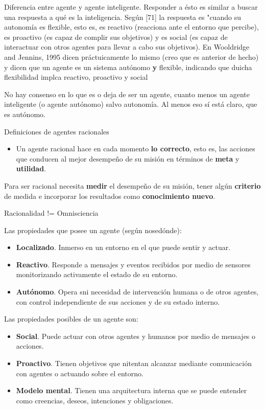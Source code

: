 Diferencia entre agente y agente inteligente. Responder a ésto es similar a buscar una respuesta a qué es la inteligencia. Según [71] la respuesta es "cuando su autonomía es flexible, esto es, es reactivo (reacciona ante el entorno que percibe), es proactivo (es capaz de complir sus objetivos) y es social (es capaz de interactuar con otros agentes para llevar a cabo sus objetivos). En Wooldridge and Jennins, 1995 dicen práctuicamente lo mismo (creo que es anterior de hecho) y dicen que un agente es un sistema autónomo \textbf{y} flexible, indicando que duicha flexibilidad implca reactivo, proactivo y social

No hay consenso en lo que es o deja de ser un agente, cuanto menos un agente inteligente (o agente autónomo) salvo autonomía. Al menos eso sí está claro, que es autónomo.

Definiciones de agentes racionales

\begin{itemize}
	\item Un agente racional hace en cada momento \textbf{lo correcto}, esto es, las acciones que conducen al mejor desempeño de su misión en términos de \textbf{meta} y \textbf{utilidad}.
\end{itemize}

Para ser racional necesita \textbf{medir} el desempeño de su misión, tener algún \textbf{criterio} de medida e incorporar los resultados como \textbf{conocimiento nuevo}.

Racionalidad != Omnisciencia

Las propiedades que posee un agente (según nosedónde):

\begin{itemize}
	\item \textbf{Localizado}. Inmerso en un entorno en el que puede sentir y actuar.
	\item \textbf{Reactivo}. Responde a mensajes y eventos recibidos por medio de sensores monitorizando activamente el estado de su entorno.
	\item \textbf{Autónomo}. Opera sni necesidad de intervención humana o de otros agentes, con control independiente de sus acciones y de su estado interno.
\end{itemize}

Las propiedades posibles de un agente son:

\begin{itemize}
	\item \textbf{Social}. Puede actuar con otros agentes y humanos por medio de mensajes o acciones.
	\item \textbf{Proactivo}. Tienen objetivos que nitentan alcanzar mediante comunicación con agentes o actuando sobre el entorno.
	\item \textbf{Modelo mental}. Tienen una arquitectura interna que se puede entender como creencias, deseos, intenciones y obligaciones.
\end{itemize}

